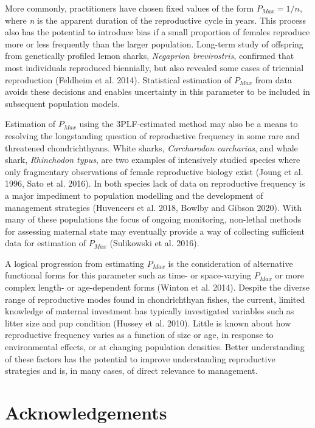 \documentclass[
]{article}
\begin{document}
More commonly, practitioners have chosen fixed values of the form \(P_{Max} = 1/n\), where \emph{n} is the apparent duration of the reproductive cycle in years. This process also has the potential to introduce bias if a small proportion of females reproduce more or less frequently than the larger population. Long-term study of offspring from genetically profiled lemon sharks, \emph{Negaprion brevirostris}, confirmed that most individuals reproduced biennially, but also revealed some cases of triennial reproduction (Feldheim et al. 2014). Statistical estimation of \(P_{Max}\) from data avoids these decisions and enables uncertainty in this parameter to be included in subsequent population models.

Estimation of \(P_{Max}\) using the 3PLF-estimated method may also be a means to resolving the longstanding question of reproductive frequency in some rare and threatened chondrichthyans. White sharks, \emph{Carcharodon carcharias}, and whale shark, \emph{Rhinchodon typus}, are two examples of intensively studied species where only fragmentary observations of female reproductive biology exist (Joung et al. 1996, Sato et al. 2016). In both species lack of data on reproductive frequency is a major impediment to population modelling and the development of management strategies (Huveneers et al. 2018, Bowlby and Gibson 2020). With many of these populations the focus of ongoing monitoring, non-lethal methods for assessing maternal state may eventually provide a way of collecting sufficient data for estimation of \(P_{Max}\) (Sulikowski et al. 2016).

A logical progression from estimating \(P_{Max}\) is the consideration of alternative functional forms for this parameter such as time- or space-varying \(P_{Max}\) or more complex length- or age-dependent forms (Winton et al. 2014). Despite the diverse range of reproductive modes found in chondrichthyan fishes, the current, limited knowledge of maternal investment has typically investigated variables such as litter size and pup condition (Hussey et al. 2010). Little is known about how reproductive frequency varies as a function of size or age, in response to environmental effects, or at changing population densities. Better understanding of these factors has the potential to improve understanding reproductive strategies and is, in many cases, of direct relevance to management.

\section{Acknowledgements}\label{acknowledgements}
\end{document}
